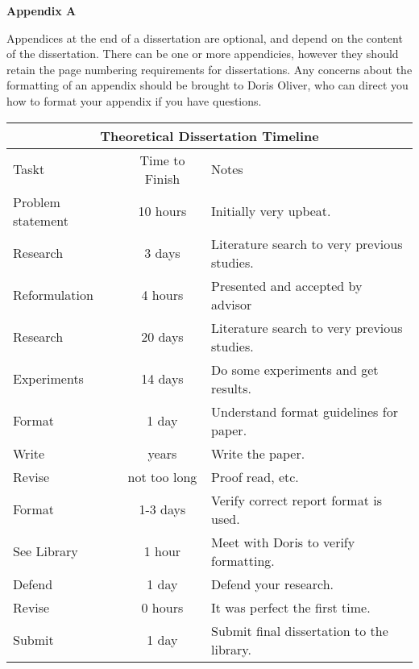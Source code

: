 \noindent \textbf{Appendix A}
\vspace{12pt}

\noindent Appendices at the end of a dissertation are optional, and depend on the content of the dissertation. There can be one or more appendicies, however they should retain the page numbering requirements for dissertations.  Any concerns about the formatting of an appendix should be brought to Doris Oliver, who can direct you how to format your appendix if you have questions.

\begin{center}
\begin{tabular}{|l|c|p{3.0in}|}
\hline
\multicolumn{3}{|c|}{Theoretical Dissertation Timeline}\\ \hline
Taskt & Time to Finish & Notes\\ \hline
Problem statement & 10 hours & Initially very upbeat.\\ \hline
Research & 3 days&Literature search to very previous studies.\\ \hline
Reformulation&4 hours&Presented and accepted by advisor\\ \hline
Research&20 days&Literature search to very previous  studies.\\ \hline
Experiments&14 days&Do some experiments and get results.\\ \hline
Format&1 day&Understand format guidelines for paper.\\ \hline
Write&years&Write the paper.\\ \hline
Revise&not too long&Proof read, etc.\\ \hline
Format&1-3 days&Verify correct report format is used.\\ \hline
See Library&1 hour&Meet with Doris to verify formatting.\\ \hline
Defend&1 day&Defend your research.\\ \hline
Revise&0 hours&It was perfect the first time.\\ \hline
Submit&1 day&Submit final dissertation to the library.\\ \hline
\end{tabular}
\end{center}
\newpage
